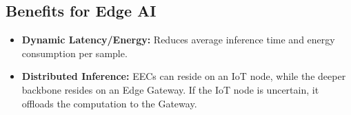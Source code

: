 \subsection{Benefits for Edge AI}
\begin{itemize}
    \item \textbf{Dynamic Latency/Energy:} Reduces average inference time and energy consumption per sample.
    \item \textbf{Distributed Inference:} EECs can reside on an IoT node, while the deeper backbone resides on an Edge Gateway. If the IoT node is uncertain, it offloads the computation to the Gateway.
\end{itemize}

